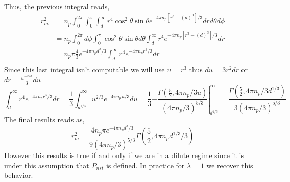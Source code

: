 Thus, the previous integral reads, 
\begin{align*}
    r_m^2 
    &= n_p \int_{0}^{2\pi}\int_{0}^{\pi}\int_{d}^{\infty}
     r^4 \cos^2\theta\sin\theta e^{-4\pi n_p [r^3- (d)^3]/3}
    drd\theta d\phi\\
    &= n_p \int_{0}^{2\pi}d\phi 
    \int_{0}^{\pi} \cos^2\theta\sin\theta d\theta 
    \int_{d}^{\infty}
     r^4  e^{-4\pi n_p [r^3- (d)^3]/3} dr\\
    &= n_p \pi
    \frac{4}{3} 
    e^{-4\pi n_p d^3 /3}
    \int_{d}^{\infty}
     r^4  e^{-4\pi n_p r^3 /3}
      dr\\
\end{align*}
Since this last integral isn't computable we will use $u = r^3$ thus $du = 3 r^2 dr$ or $dr = \frac{u^{-2/3}}{3} du$
\begin{equation*}
    \int_{d}^{\infty}
     r^4  e^{-4\pi n_p r^3 /3}
      dr
      = \frac{1}{3} 
      \int_{d^{1/3}}^{\infty}
        u^{2/3}  e^{-4\pi n_p u /3}
      du
      = \frac{1}{3}\left.
        -\frac{\Gamma(\frac{5}{2}, 4\pi n_p/3 u )}{(4\pi n_p/3)^{5/3}}
        \right|_{d^{1/3}}^\infty
      = 
        \frac{\Gamma(\frac{5}{2}, 4\pi n_p/3 d^{1/3} )}{3(4\pi n_p/3)^{5/3}}
\end{equation*}
The final results reads as,
\begin{equation*}
    r_m^2 =
    \frac{4n_p \pi e^{-4\pi n_p d^3 /3}}{9(4\pi n_p / 3)^{5/3}}
    \Gamma\left(\frac{5}{2}, 4\pi n_p d^{1/3} / 3 \right)
\end{equation*}
However this results is true if and only if we are in a dilute regime since it is under this assumption that $P_{nst}$ is defined. 
In practice for $\lambda = 1$ we recover this behavior. 